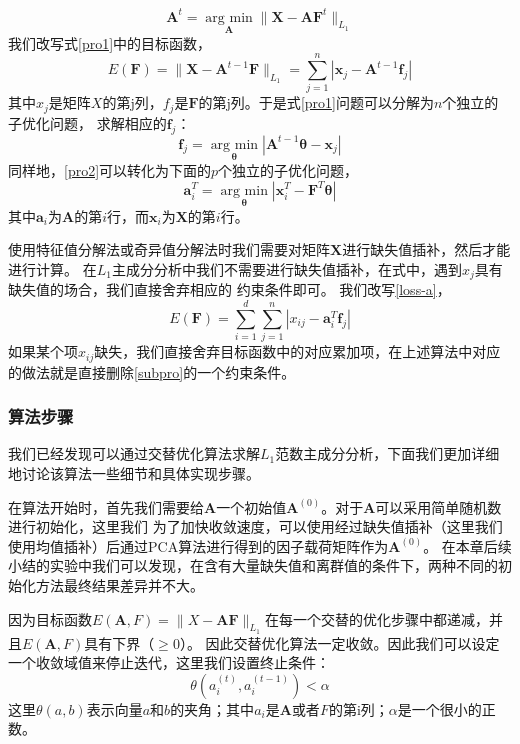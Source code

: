 \begin{equation}\label{pro2}
\bm{A}^{t} = \underset{\bm{A}}{\operatorname{arg\ min}} \|\bm X - \bm{A}\bm F^{t}\|_{L_1} 
\end{equation}
我们改写式\eqref{pro1}中的目标函数，
\begin{equation}\label{loss-a}
E(\bm{F}) = \|\bm{X} - \bm{A}^{t-1}\bm{F} \|_{L_1} = \sum_{j=1}^{n}|\bm{x}_j - \bm{A}^{t-1}\bm{f}_j| 
\end{equation}
其中$x_j$是矩阵$X$的第j列，$f_j$是$\bm{F}$的第j列。于是式\eqref{pro1}问题可以分解为$n$个独立的子优化问题，
求解相应的$\bm{f}_j$：
\begin{equation}\label{subpro}
    \bm{f}_j = \underset{\bm{\theta}}{\operatorname{arg\ min}} |\bm{A}^{t-1}\bm{\theta} - \bm{x}_j|
\end{equation}
同样地，\eqref{pro2}可以转化为下面的$p$个独立的子优化问题，
\begin{equation}\label{subproabs}
    \bm{a}_i^T = \underset{\bm{\theta}}{\operatorname{arg\ min}} |\bm{x}_i^T - \bm{F}^T\bm{\theta}|
\end{equation}
其中$\bm{a}_i$为$\bm{A}$的第$i$行，而$\bm{x}_i$为$\bm{X}$的第$i$行。

使用特征值分解法或奇异值分解法时我们需要对矩阵$\bm{X}$进行缺失值插补，然后才能进行计算。
在$L_1$主成分分析中我们不需要进行缺失值插补，在式中，遇到$x_j$具有缺失值的场合，我们直接舍弃相应的
约束条件即可。
我们改写\eqref{loss-a}，
$$E(\bm F) = \sum_{i=1}^d \sum_{j=1}^n |x_{ij} - \bm a_i^T\bm f_j|$$
如果某个项$x_{ij}$缺失，我们直接舍弃目标函数中的对应累加项，在上述算法中对应的做法就是直接删除\eqref{subpro}的一个约束条件。

\subsubsection{算法步骤}
我们已经发现可以通过交替优化算法求解$L_1$范数主成分分析，下面我们更加详细地讨论该算法一些细节和具体实现步骤。

在算法开始时，首先我们需要给$\bm{A}$一个初始值$\bm{A}^{(0)}$。对于$\bm{A}$可以采用简单随机数进行初始化，这里我们
为了加快收敛速度，可以使用经过缺失值插补（这里我们使用均值插补）后通过PCA算法进行得到的因子载荷矩阵作为$\bm{A}^{(0)}$。
在本章后续小结的实验中我们可以发现，在含有大量缺失值和离群值的条件下，两种不同的初始化方法最终结果差异并不大。

因为目标函数$E(\bm{A}, F) = \|X - \bm{A}\bm{F}\|_{L_1}$在每一个交替的优化步骤中都递减，并且$E(\bm{A},F)$具有下界（$\geq 0$）。
因此交替优化算法一定收敛。因此我们可以设定一个收敛域值来停止迭代，这里我们设置终止条件：
    $$ \theta(a_i^{(t)}, a_i^{(t-1)}) <  \alpha $$
这里$\theta(a, b)$表示向量$a$和$b$的夹角；其中$a_i$是$\bm{A}$或者$F$的第i列；$\alpha$是一个很小的正数。

